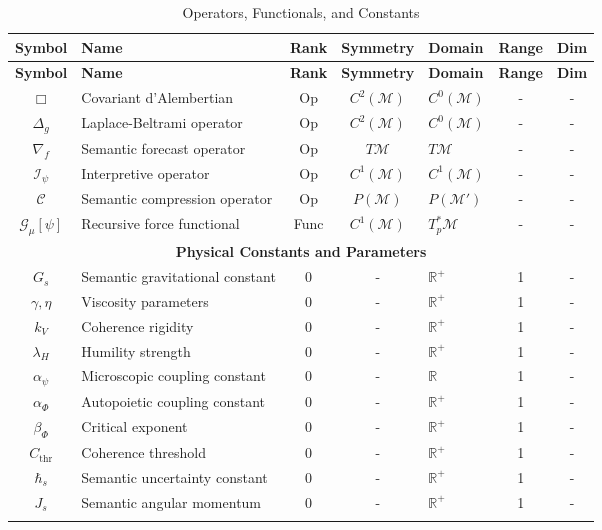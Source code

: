 {\small
\renewcommand{\arraystretch}{1.1}
\begin{longtable}{|c|p{5.5cm}|c|c|p{1.8cm}|c|c|}
\hline
\textbf{Symbol} & \textbf{Name} & \textbf{Rank} & \textbf{Symmetry} & \textbf{Domain} & \textbf{Range} & \textbf{Dim} \\
\hline
\endfirsthead
\hline
\textbf{Symbol} & \textbf{Name} & \textbf{Rank} & \textbf{Symmetry} & \textbf{Domain} & \textbf{Range} & \textbf{Dim} \\
\hline
\endhead
\(\Box\) & Covariant d'Alembertian & Op & \(C^2(\mathcal{M})\) & \(C^0(\mathcal{M})\) & - & - \\
\hline
\(\Delta_g\) & Laplace-Beltrami operator & Op & \(C^2(\mathcal{M})\) & \(C^0(\mathcal{M})\) & - & - \\
\hline
\(\nabla_f\) & Semantic forecast operator & Op & \(T\mathcal{M}\) & \(T\mathcal{M}\) & - & - \\
\hline
\(\mathcal{I}_{\psi}\) & Interpretive operator & Op & \(C^1(\mathcal{M})\) & \(C^1(\mathcal{M})\) & - & - \\
\hline
\(\mathcal{C}\) & Semantic compression operator & Op & \(P(\mathcal{M})\) & \(P(\mathcal{M}')\) & - & - \\
\hline
\(\mathcal{G}_\mu[\psi]\) & Recursive force functional & Func & \(C^1(\mathcal{M})\) & \(T_p^*\mathcal{M}\) & - & - \\
\hline
\hline
\multicolumn{7}{|c|}{\textbf{Physical Constants and Parameters}} \\
\hline
\(G_s\) & Semantic gravitational constant & 0 & - & \(\mathbb{R}^+\) & 1 & - \\
\hline
\(\gamma, \eta\) & Viscosity parameters & 0 & - & \(\mathbb{R}^+\) & 1 & - \\
\hline
\(k_V\) & Coherence rigidity & 0 & - & \(\mathbb{R}^+\) & 1 & - \\
\hline
\(\lambda_H\) & Humility strength & 0 & - & \(\mathbb{R}^+\) & 1 & - \\
\hline
\(\alpha_{\psi}\) & Microscopic coupling constant & 0 & - & \(\mathbb{R}\) & 1 & - \\
\hline
\(\alpha_{\Phi}\) & Autopoietic coupling constant & 0 & - & \(\mathbb{R}^+\) & 1 & - \\
\hline
\(\beta_{\Phi}\) & Critical exponent & 0 & - & \(\mathbb{R}^+\) & 1 & - \\
\hline
\(C_{\text{thr}}\) & Coherence threshold & 0 & - & \(\mathbb{R}^+\) & 1 & - \\
\hline
\(\hbar_s\) & Semantic uncertainty constant & 0 & - & \(\mathbb{R}^+\) & 1 & - \\
\hline
\(J_s\) & Semantic angular momentum & 0 & - & \(\mathbb{R}^+\) & 1 & - \\
\hline
\caption{Operators, Functionals, and Constants}
\end{longtable}
}

